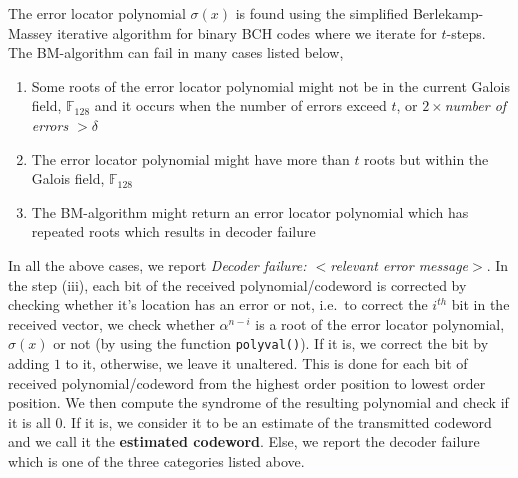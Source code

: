 \documentclass[10 pt]{article}
\begin{document}
The error locator polynomial $\sigma(x)$ is found using the simplified Berlekamp-Massey iterative algorithm for binary BCH codes where we iterate for $t$-steps. The BM-algorithm can fail in many cases listed below,
\renewcommand{\labelenumi}{$\bullet$}
\begin{enumerate}
	\item Some roots of the error locator polynomial might not be in the current Galois field, $\mathbb{F}_{128}$ and it occurs when the number of errors exceed $t$, or \textit{$2\times$number of errors $> \delta$}
    \item The error locator polynomial might have more than $t$ roots but within the Galois field, $\mathbb{F}_{128}$
    \item The BM-algorithm might return an error locator polynomial which has repeated roots which results in decoder failure
\end{enumerate}
In all the above cases, we report \textit{Decoder failure: $<$relevant error message$>$}. In the step (iii), each bit of the received polynomial/codeword is corrected by checking whether it's location has an error or not, i.e.\ to correct the $i^{th}$ bit in the received vector, we check whether $\alpha^{n-i}$ is a root of the error locator polynomial, $\sigma(x)$ or not (by using the function \texttt{polyval()}). If it is, we correct the bit by adding $1$ to it, otherwise, we leave it unaltered. This is done for each bit of received polynomial/codeword from the highest order position to lowest order position. We then compute the syndrome of the resulting polynomial and check if it is all $0$. If it is, we consider it to be an estimate of the transmitted codeword and we call it the \textbf{estimated codeword}. Else, we report the decoder failure which is one of the three categories listed above.
\end{document}
